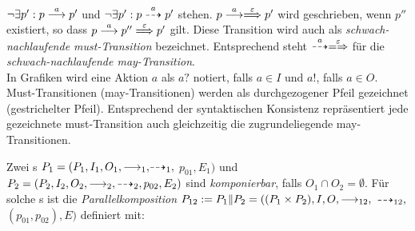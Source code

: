 $\neg\exists p': p\must[a]p'$ und $\neg\exists p': p\may[a]p'$ stehen.
$p\must[a]\weakmust[\varepsilon]p'$ wird geschrieben, wenn $p''$ existiert, so
dass $p\must[a]p''\weakmust[\varepsilon]p'$ gilt. Diese Transition wird auch
als \emph{schwach-nachlaufende must-Transition} bezeichnet. Entsprechend steht
$\may[a]\weakmay[\varepsilon]$ für die \emph{schwach-nachlaufende
may-Transition}.\\
In Grafiken wird eine Aktion $a$ als $a?$ notiert, falls $a\in I$ und $a!$,
falls $a\in O$. Must-Transitionen (may-Transitionen) werden als durchgezogener
Pfeil gezeichnet (gestrichelter Pfeil). Entsprechend der syntaktischen
Konsistenz repräsentiert jede gezeichnete must-Transition auch gleichzeitig die
zugrundeliegende may-Transitionen.

\begin{Def}[Parallelkomposition]
  \label{ParallelDef}
  Zwei \MEIO{}s $P_1 = (P_1,I_1,O_1,{\must_1,}{\may_1,}$ $p_{01},E_1)$ und $P_2 =
  (P_2,I_2,O_2,\must_2,\may_2,p_{02},E_2)$ sind \emph{komponierbar}, falls
  $O_1\cap O_2=\emptyset$. Für solche \MEIO{}s ist die
  \emph{Parallelkomposition} $P_{12} := P_1\|P_2=((P_1\times P_2), I, O,
  {\must_{12},}$ ${\may_{12},}$ $(p_{01}, p_{02}), E)$ definiert mit:
\end{Def}
